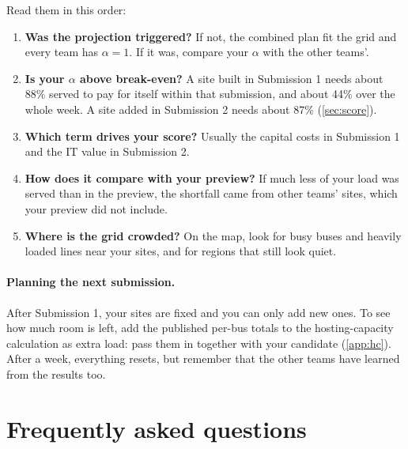 \documentclass[10pt]{article}
\newcommand{\code}[1]{\path{#1}}
\begin{document}
Read them in this order:
\begin{enumerate}[leftmargin=*]
  \item \textbf{Was the projection triggered?} If not, the combined plan fit
    the grid and every team has $\alpha = 1$. If it was, compare your
    $\alpha$ with the other teams'.
  \item \textbf{Is your $\alpha$ above break-even?} A site built in
    Submission 1 needs about 88\% served to pay for itself within that
    submission, and about 44\% over the whole week. A site added in
    Submission 2 needs about 87\% (\cref{sec:score}).
  \item \textbf{Which term drives your score?} Usually the capital costs in
    Submission 1 and the IT value in Submission 2.
  \item \textbf{How does it compare with your preview?} If much less of your
    load was served than in the preview, the shortfall came from other teams'
    sites, which your preview did not include.
  \item \textbf{Where is the grid crowded?} On the map, look for busy buses and
    heavily loaded lines near your sites, and for regions that still look
    quiet.
\end{enumerate}

\paragraph{Planning the next submission.} After Submission 1, your sites are
fixed and you can only add new ones. To see how much room is left, add the
published per-bus totals to the hosting-capacity calculation as extra load:
pass them in \code{additional_demand_mw_by_bus} together with your candidate
(\cref{app:hc}). After a week, everything resets, but remember that the other
teams have learned from the results too.

\section{Frequently asked questions}\label{sec:faq}
\end{document}
